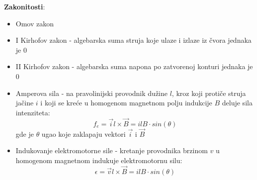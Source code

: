 \documentclass[10pt]{report}
\begin{document}
	\textbf{Zakonitosti}:
	\begin{itemize}
		\item Omov zakon
		\item I Kirhofov zakon - algebarska suma struja koje ulaze i izlaze iz čvora jednaka je 0
		\item II Kirhofov zakon - algebarska suma napona po zatvorenoj konturi jednaka je 0
		\item Amperova sila - na pravolinijski provodnik dužine $l$, kroz koji protiče struja jačine $i$ i koji se kreće u homogenom
		magnetnom polju indukcije $B$ deluje sila intenziteta:
			$$f_e = \vec{i}l \times \vec{B} = ilB \cdot sin(\theta)$$
		gde je $\theta$ ugao koje zaklapaju vektori $\vec{i}$ i $\vec{B}$
		\item Indukovanje elektromotorne sile - kretanje provodnika brzinom $v$ u homogenom magnetnom indukuje elektromotornu silu:
			$$\epsilon = \vec{v}l \times \vec{B} = ilB \cdot sin(\theta)$$

	\end{itemize}
\end{document}
